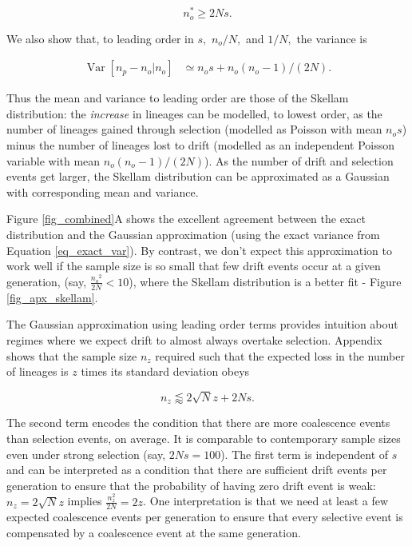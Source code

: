 \documentclass[9pt,twocolumn,twoside,lineno]{gsajnl}
\begin{document}
\begin{equation}
  \label{eq_critical_sample}
  n_o^* \ge 2N s.
\end{equation}

We also show that, to leading order in $s,$ $n_o/N,$ and $1/N,$ the variance is

\begin{equation}
  \begin{aligned}
    \operatorname{Var}[n_p-n_o | n_o] &\simeq
   n_o  s +   n_o (n_o-1)/(2 N).
    \label{eq_gauss_var}
  \end{aligned}
\end{equation}

Thus the mean and variance to leading order are those of the Skellam distribution: the
\textit{increase} in lineages can be modelled, to lowest order, as the number of lineages gained
through selection (modelled as Poisson with mean  $ n_o s$) minus the number of lineages lost to
drift (modelled as an independent Poisson variable with mean  $ n_o (n_o-1)/(2 N)$).
As the number of drift and selection events get larger, the Skellam distribution can be approximated as a
Gaussian with corresponding mean and variance.


Figure \ref{fig_combined}A shows the excellent agreement between the exact distribution and the
Gaussian approximation (using the exact variance from Equation \ref{eq_exact_var}). By contrast,
we don't expect this approximation to work well if the sample size is so small that few drift
events occur at a given generation, (say, $\frac{{n_o}^2}{2N} < 10$), where the Skellam
distribution is a better fit - Figure \ref{fig_apx_skellam}.

The Gaussian approximation using leading order terms provides intuition about regimes where we
expect drift to almost always overtake selection.  Appendix  shows that the sample size
$n_z$ required such that the expected loss in the number of lineages is $z$ times its standard deviation
obeys

\begin{equation}
  n_z \lessapprox 2 \sqrt{N} z + 2N s.
\label{eq_nz}
\end{equation}

The second term
encodes the condition that there are more coalescence events than selection events, on average. 
It is comparable to contemporary sample sizes even under strong selection (say, $2Ns=100$).
The
first term is independent of $s$ and can be interpreted as a condition that there are sufficient
drift events per generation to ensure that the probability of having zero drift event is weak: $n_z
= 2 \sqrt N z$ implies $\frac{n_z^2}{2N}= 2 z$. One interpretation is that we need at least a few
expected coalescence events per generation to ensure that every selective event is compensated by a
coalescence event at the same generation.
\end{document}
